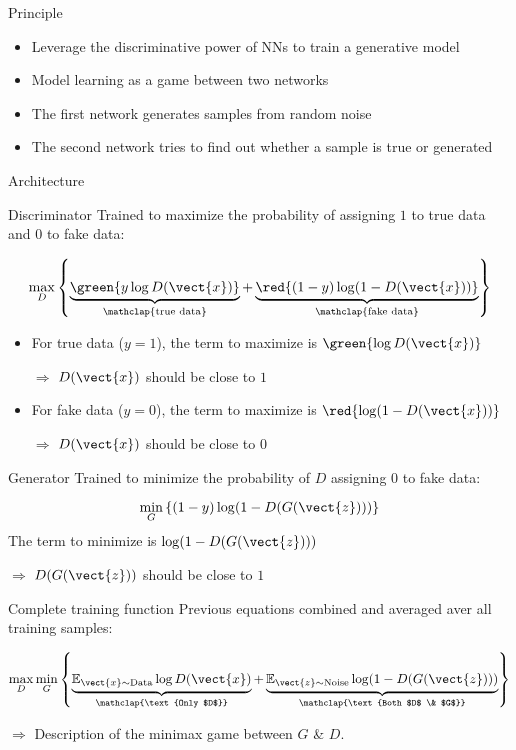 \begin{frame}{Principle}
  \begin{itemize}[<+->]
    \item Leverage the discriminative power of NNs to train a generative model
    \item Model learning as a game between two networks
    \item The first network generates samples from random noise
    \item The second network tries to find out whether a sample is true or generated
  \end{itemize}
\end{frame}

\begin{frame}{Architecture}
\end{frame}

\begin{frame}{Discriminator}
  Trained to maximize the probability of assigning $1$ to true data and $0$ to fake data:

  \[
    \max_D
      \left\{
        \underbrace{\green{y \log D(\vect{x})}}_{\mathclap{\text{true data}}}
        +
        \underbrace{\red{(1 - y) \log (1 - D(\vect{x}))}}_{\mathclap{\text{fake data}}}
      \right\}
  \]

  \begin{itemize}[<+(1)->]
    \item For true data ($y=1$), the term to maximize is $\green{\log D(\vect{x})}$

    $\Rightarrow$ $D(\vect{x})$ should be close to $1$
    \item For fake data ($y=0$), the term to maximize is $\red{\log (1 - D(\vect{x}))}$

    $\Rightarrow$ $D(\vect{x})$ should be close to $0$
  \end{itemize}
\end{frame}

\begin{frame}{Generator}
  Trained to minimize the probability of $D$ assigning $0$ to fake data:

  \[
    \min_G
      \left\{
        (1 - y) \log (1 - D(G(\vect{z})))
      \right\}
  \]
  The term to minimize is $\log (1 - D(G(\vect{z})))$

  $\Rightarrow$ $D(G(\vect{z}))$ should be close to $1$
\end{frame}

\begin{frame}{Complete training function}
  Previous equations combined and averaged aver all training samples:

  \[
    \max_D \min_G \left\{
      \underbrace{\mathbb{E}_{\vect{x} \sim \text{Data}} \log D(\vect{x})}_{\mathclap{\text{Only $D$}}}
      + \underbrace{\mathbb{E}_{\vect{z} \sim \text{Noise}} \log (1 - D(G(\vect{z})))}_{\mathclap{\text{Both $D$ \& $G$}}}
    \right\}
  \]

  $\Rightarrow$ Description of the minimax game between $G$ \& $D$.
\end{frame}

